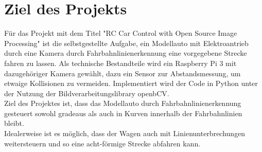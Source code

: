 \section{Ziel des Projekts}
Für das Projekt mit dem Titel "RC Car Control with Open Source Image Processing"
ist die selbstgestellte Aufgabe, ein Modellauto mit Elektroantrieb durch eine Kamera
durch Fahrbahnlinienerkennung eine vorgegebene Strecke fahren zu lassen. Als
technische Bestandteile wird ein Raspberry Pi 3 mit dazugehöriger Kamera
gewählt, dazu ein Sensor zur Abstandsmessung, um etwaige Kollisionen zu
vermeiden. Implementiert wird der Code in Python unter der Nutzung der
Bildverarbeitungslibrary openbCV. \\
Ziel des Projektes ist, dass das Modellauto durch Fahrbahnlinienerkennung
gesteuert sowohl gradeaus als auch in Kurven innerhalb der Fahrbahnlinien
bleibt.\\
Idealerweise ist es möglich, dass der Wagen auch mit Linienunterbrechungen
weitersteuern und so eine acht-förmige Strecke abfahren kann.\\

